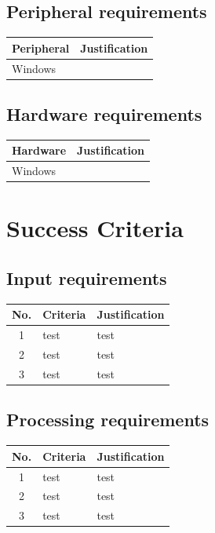 \documentclass[11pt,a4paper]{report}
\begin{document}
\subsection{Peripheral requirements}
\begin{center}
\begin{tabular}{ | m{4.5em} | m{35em} |}
    \hline
    Peripheral & Justification \\
    \hline
    Windows & \\
    \hline
\end{tabular}
\end{center}

\subsection{Hardware requirements}
\begin{center}
\begin{tabular}{ | m{4.5em} | m{35em} | }
    \hline
    Hardware & Justification \\
    \hline
    Windows & \\
    \hline
\end{tabular}
\end{center}



\section{Success Criteria}

\subsection{Input requirements}
\begin{center}
\begin{tabular}{ | c | m{18em} | m{18em} | }
\hline
 \textbf{No.} & \textbf{Criteria} & \textbf{Justification} \\
\hline
1 & test & test \\
\hline
2 & test & test \\
\hline
3 & test & test \\
\hline
\end{tabular}
\end{center}

\subsection{Processing requirements}
\begin{center}
\begin{tabular}{ | c | m{18em} | m{18em} | }
\hline
 \textbf{No.} & \textbf{Criteria} & \textbf{Justification} \\
\hline
1 & test & test \\
\hline
2 & test & test \\
\hline
3 & test & test \\
\hline
\end{tabular}
\end{center}
\end{document}
